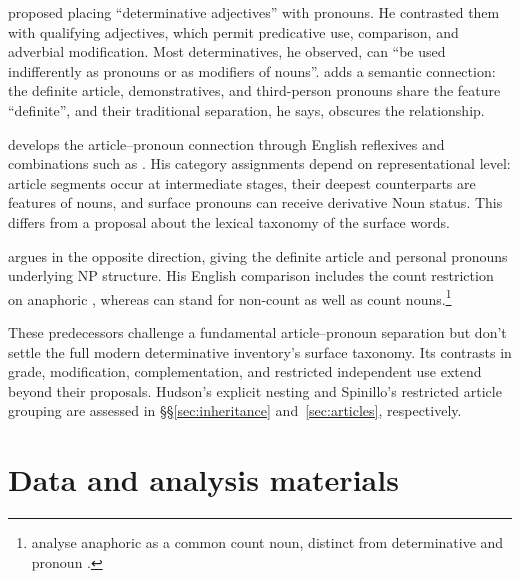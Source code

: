 \documentclass[12pt]{article}
\begin{document}
\textcite[24]{palmer1924} proposed placing \enquote{determinative adjectives} with pronouns. He contrasted them with qualifying adjectives, which permit predicative use, comparison, and adverbial modification. Most determinatives, he observed, can \enquote{be used indifferently as pronouns or as modifiers of nouns}. \textcite[279]{lyons1968} adds a semantic connection: the definite article, demonstratives, and third-person pronouns share the feature \enquote{definite}, and their traditional separation, he says, obscures the relationship.

\textcite{postal1966} develops the article--pronoun connection through English reflexives and combinations such as . His category assignments depend on representational level: article segments occur at intermediate stages, their deepest counterparts are features of nouns, and surface pronouns can receive derivative Noun status. This differs from a proposal about the lexical taxonomy of the surface words.

\textcite[197--203]{sommerstein1972} argues in the opposite direction, giving the definite article and personal pronouns underlying NP structure. His English comparison includes the count restriction on anaphoric , whereas  can stand for non-count as well as count nouns.\footnote{\textcite[797--798]{payne2013anaphoric} analyse anaphoric  as a common count noun, distinct from determinative  and pronoun .}

These predecessors challenge a fundamental article--pronoun separation but don't settle the full modern determinative inventory's surface taxonomy. Its contrasts in grade, modification, complementation, and restricted independent use extend beyond their proposals. Hudson's explicit nesting and Spinillo's restricted article grouping are assessed in §§\ref{sec:inheritance} and~\ref{sec:articles}, respectively.

\section*{Data and analysis materials}
\end{document}
